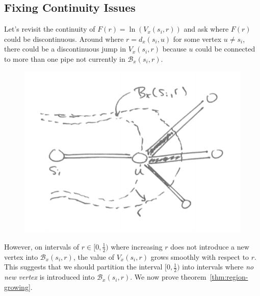 
\subsection{Fixing Continuity Issues}

Let's revisit the continuity of $F(r) = \ln(V_x(s_i, r))$ and ask where $F(r)$ could be discontinuous. Around where $r = d_x(s_i, u)$ for some vertex $u \neq s_i$, there could be a discontinuous jump in $V_x(s_i, r)$ because $u$ could be connected to more than one pipe not currently in $\mathcal{B}_x(s_i, r)$.
\begin{figure}[h!]
    \centering
    \includegraphics[scale=0.6]{images/image-2.png}
\end{figure}
\vspace{-1em}

However, on intervals of $r \in [0, \frac{1}{2})$ where increasing $r$ does not introduce a new vertex into $\mathcal{B}_x(s_i, r)$, the value of $V_x(s_i, r)$ grows smoothly with respect to $r$. This suggests that we should partition the interval $[0, \frac{1}{2})$ into intervals where \emph{no new vertex} is introduced into $\mathcal{B}_x(s_i, r)$. We now prove theorem~\ref{thm:region-growing}.

